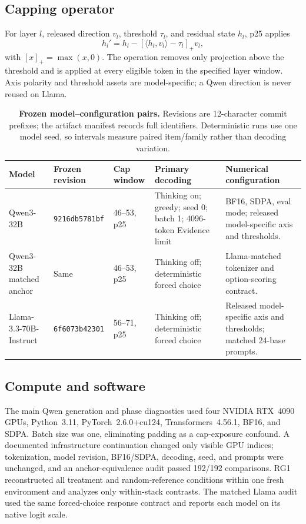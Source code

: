 \documentclass[letterpaper]{article}
\begin{document}
\subsection{Capping operator}

For layer $l$, released direction $v_l$, threshold $\tau_l$, and residual state $h_l$, p25 applies
\begin{equation}
h_l' = h_l-\left[\langle h_l,v_l\rangle-\tau_l\right]_+v_l,
\end{equation}
with $[x]_+=\max(x,0)$.  The operation removes only projection above the threshold and is applied at every eligible token in the specified layer window.  Axis polarity and threshold assets are model-specific; a Qwen direction is never reused on Llama.

\begin{table}[t]
\centering
\scriptsize
\setlength{\tabcolsep}{3pt}
\renewcommand{\arraystretch}{1.12}
\begin{tabularx}{\textwidth}{@{}L{2.25cm}L{2.15cm}L{1.75cm}L{3.15cm}Y@{}}
\toprule
Model & Frozen revision & Cap window & Primary decoding & Numerical configuration \\
\midrule
Qwen3-32B & \texttt{9216db5781bf} & 46--53, p25 & Thinking on; greedy; seed 0; batch 1; 4096-token Evidence limit & BF16, SDPA, eval mode; released model-specific axis and thresholds. \\
Qwen3-32B matched anchor & Same & 46--53, p25 & Thinking off; deterministic forced choice & Llama-matched tokenizer and option-scoring contract. \\
Llama-3.3-70B-Instruct & \texttt{6f6073b42301} & 56--71, p25 & Thinking off; deterministic forced choice & Released model-specific axis and thresholds; matched 24-base prompts. \\
\bottomrule
\end{tabularx}
\caption{\textbf{Frozen model--configuration pairs.} Revisions are 12-character commit prefixes; the artifact manifest records full identifiers. Deterministic runs use one model seed, so intervals measure paired item/family rather than decoding variation.}
\label{tab:supp-models}
\end{table}

\subsection{Compute and software}

The main Qwen generation and phase diagnostics used four NVIDIA RTX~4090 GPUs, Python~3.11, PyTorch~2.6.0+cu124, Transformers~4.56.1, BF16, and SDPA.  Batch size was one, eliminating padding as a cap-exposure confound.  A documented infrastructure continuation changed only visible GPU indices; tokenization, model revision, BF16/SDPA, decoding, seed, and prompts were unchanged, and an anchor-equivalence audit passed 192/192 comparisons.  RG1 reconstructed all treatment and random-reference conditions within one fresh environment and analyzes only within-stack contrasts.  The matched Llama audit used the same forced-choice response contract and reports each model on its native logit scale.
\end{document}

